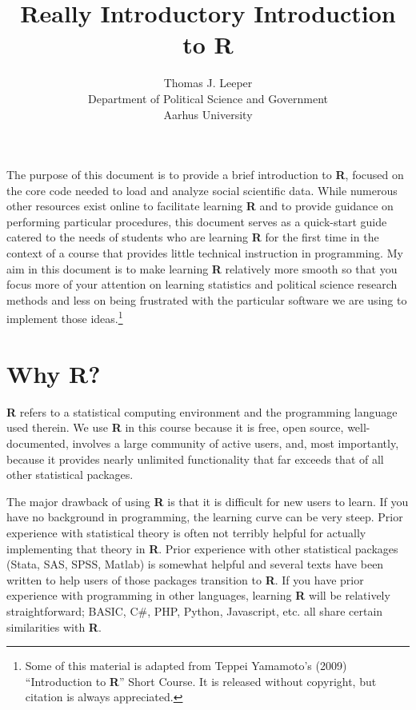 \documentclass[12pt]{article}\usepackage[]{graphicx}\usepackage[]{color}
\title{Really Introductory Introduction to R}
\author{Thomas J. Leeper\\
Department of Political Science and Government\\
Aarhus University}
\begin{document}
\maketitle

{\abstract The purpose of this document is to provide a brief introduction to \textbf{R}, focused on the core code needed to load and analyze social scientific data. While numerous other resources exist online to facilitate learning \textbf{R} and to provide guidance on performing particular procedures, this document serves as a quick-start guide catered to the needs of students who are learning \textbf{R} for the first time in the context of a course that provides little technical instruction in programming. My aim in this document is to make learning \textbf{R} relatively more smooth so that you focus more of your attention on learning statistics and political science research methods and less on being frustrated with the particular software we are using to implement those ideas.\footnote{Some of this material is adapted from Teppei Yamamoto's (2009) ``Introduction to \textbf{R}'' Short Course. It is released without copyright, but citation is always appreciated.}}

\section{Why R?}\label{sec:intro}
\textbf{R} refers to a statistical computing environment and the programming language used therein. We use \textbf{R} in this course because it is free, open source, well-documented, involves a large community of active users, and, most importantly, because it provides nearly unlimited functionality that far exceeds that of all other statistical packages.

The major drawback of using \textbf{R} is that it is difficult for new users to learn. If you have no background in programming, the learning curve can be very steep. Prior experience with statistical theory is often not terribly helpful for actually implementing that theory in \textbf{R}. Prior experience with other statistical packages (Stata, SAS, SPSS, Matlab) is somewhat helpful and several texts have been written to help users of those packages transition to \textbf{R}. If you have prior experience with programming in other languages, learning \textbf{R} will be relatively straightforward; BASIC, C\#, PHP, Python, Javascript, etc. all share certain similarities with \textbf{R}.
\end{document}
